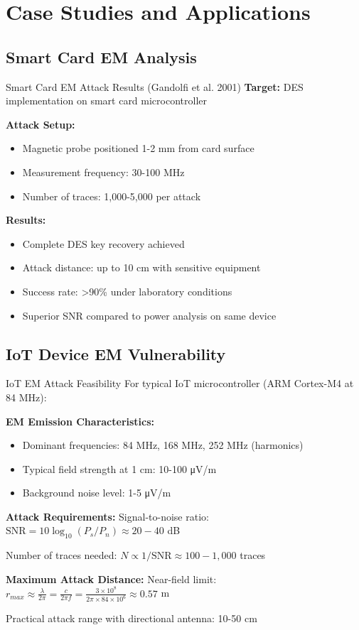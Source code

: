 \documentclass[11pt,a4paper]{article}
\theoremstyle{definition}
\begin{document}
\section{Case Studies and Applications}

\subsection{Smart Card EM Analysis}

\begin{examplebox}{Smart Card EM Attack Results (Gandolfi et al. 2001)}
\textbf{Target:} DES implementation on smart card microcontroller

\textbf{Attack Setup:}
\begin{itemize}
    \item Magnetic probe positioned 1-2 mm from card surface
    \item Measurement frequency: 30-100 MHz
    \item Number of traces: 1,000-5,000 per attack
\end{itemize}

\textbf{Results:}
\begin{itemize}
    \item Complete DES key recovery achieved
    \item Attack distance: up to 10 cm with sensitive equipment
    \item Success rate: >90\% under laboratory conditions
    \item Superior SNR compared to power analysis on same device
\end{itemize}
\end{examplebox}

\subsection{IoT Device EM Vulnerability}

\begin{mathematicsbox}{IoT EM Attack Feasibility}
For typical IoT microcontroller (ARM Cortex-M4 at 84 MHz):

\textbf{EM Emission Characteristics:}
\begin{itemize}
    \item Dominant frequencies: 84 MHz, 168 MHz, 252 MHz (harmonics)
    \item Typical field strength at 1 cm: 10-100 μV/m
    \item Background noise level: 1-5 μV/m
\end{itemize}

\textbf{Attack Requirements:}
Signal-to-noise ratio: $\text{SNR} = 10\log_{10}(P_s/P_n) \approx 20-40$ dB

Number of traces needed: $N \propto 1/\text{SNR} \approx 100-1,000$ traces

\textbf{Maximum Attack Distance:}
Near-field limit: $r_{max} \approx \frac{\lambda}{2\pi} = \frac{c}{2\pi f} = \frac{3 \times 10^8}{2\pi \times 84 \times 10^6} \approx 0.57$ m

Practical attack range with directional antenna: 10-50 cm
\end{mathematicsbox}
\end{document}
